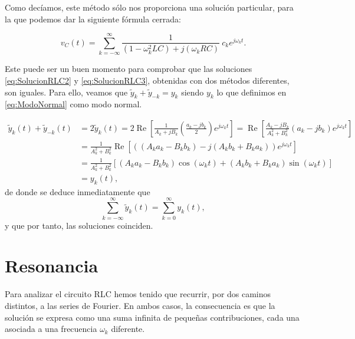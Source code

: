 Como decíamos, este método sólo nos proporciona una solución particular, para la que podemos dar la siguiente fórmula cerrada:
\begin{mybox} \vspace{-4mm}
  \begin{equation}
    \label{eq:SolucionRLC3}
    v_C(t) = \sum_{k=-\infty}^\infty \frac{1}{(1-\omega_k^2 LC) + j(\omega_k RC)}\ c_k e^{j\omega_k t}.
  \end{equation}
\end{mybox}

Este puede ser un buen momento para comprobar que las soluciones \eqref{eq:SolucionRLC2} y \eqref{eq:SolucionRLC3}, obtenidas con dos métodos diferentes, son iguales. Para ello, veamos que $ \tilde{y}_k + \tilde{y}_{-k} = y_k$ siendo $y_k$ lo que definimos en \eqref{eq:ModoNormal} como modo normal.

\begin{align*}
   \tilde{y}_k(t) + \tilde{y}_{-k}(t) 
   &= 2 \tilde{y}_k(t) = 2\operatorname{Re}\left[ \frac{1}{A_k + jB_k} \left(\frac{a_k-jb_k}{2}\right)e^{j\omega_k t} \right] = \operatorname{Re}\left[ \frac{A_k-jB_k}{A_k^2 + B_k^2} \left(a_k-jb_k\right)e^{j\omega_k t} \right] \\
   &=  \frac{1}{A_k^2 + B_k^2} \operatorname{Re}\left[ ((A_ka_k - B_kb_k) - j(A_kb_k + B_ka_k)) e^{j\omega_k t} \right] \\
   &= \frac{1}{A_k^2 + B_k^2} \left[ (A_ka_k - B_kb_k)\cos(\omega_k t) + (A_kb_k + B_ka_k)\sin(\omega_k t) \right]\\
   &= y_k(t),
\end{align*}
de donde se deduce inmediatamente que
\[
\sum_{k=-\infty}^\infty \tilde{y}_k(t) = \sum_{k=0}^\infty y_k (t),
\]
y que por tanto, las soluciones coinciden.















\section{Resonancia}
Para analizar el circuito RLC hemos tenido que recurrir, por dos caminos distintos, a las series de Fourier. En ambos casos, la consecuencia es que la solución se expresa como una suma infinita de pequeñas contribuciones, cada una asociada a una frecuencia $\omega_k$ diferente.

